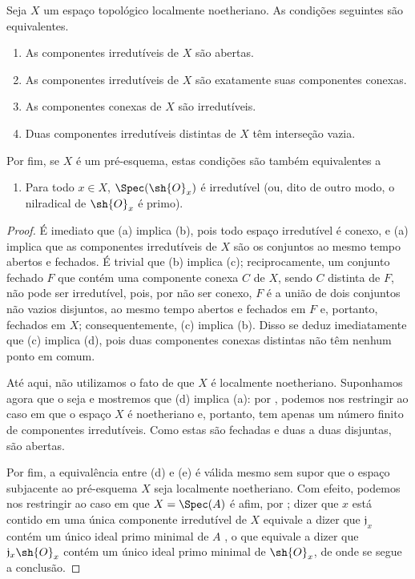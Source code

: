 \documentclass[oneside]{amsart}
\newcommand{\oldpage}[2][]{{\marginnote{\normalfont\textbf{#1}~|~#2}}\ignorespaces}
\let\EGAOriginalLabel\label
\renewcommand{\label}[1]{\phantomsection\EGAOriginalLabel{#1}}
\begin{document}
\begin{proposition}[6.1.10]
\label{I.6.1.10}
Seja $X$ um espaço topológico localmente noetheriano.
As condições seguintes são equivalentes.
\begin{enumerate}
  \item[{\rm(a)}] As componentes irredutíveis de $X$ são abertas.
  \item[{\rm(b)}] As componentes irredutíveis de $X$ são exatamente suas
    componentes conexas.
  \item[{\rm(c)}] As componentes conexas de $X$ são irredutíveis.
  \item[{\rm(d)}] Duas componentes irredutíveis distintas de $X$ têm
    interseção vazia.
\end{enumerate}
Por fim, se $X$ é um pré-esquema, estas condições são também equivalentes a
\begin{enumerate}
  \item[{\rm(e)}] Para todo $x\in X$, $\Spec(\sh{O}_x)$ é irredutível (ou,
    dito de outro modo, o nilradical de $\sh{O}_x$ é primo).
\end{enumerate}
\end{proposition}

\begin{proof}
É imediato que (a) implica (b), pois todo espaço irredutível é conexo, e (a)
implica que as componentes irredutíveis de $X$ são os conjuntos ao mesmo tempo
abertos e fechados. É trivial que (b) implica (c); reciprocamente, um conjunto
fechado $F$ que contém
\oldpage[I]{143}
uma componente conexa $C$ de $X$, sendo $C$ distinta de $F$, não pode ser
irredutível, pois, por não ser conexo, $F$ é a união de dois conjuntos não
vazios disjuntos, ao mesmo tempo abertos e fechados em $F$ e, portanto,
fechados em $X$; consequentemente, (c) implica (b). Disso se deduz
imediatamente que (c) implica (d), pois duas componentes conexas distintas não
têm nenhum ponto em comum.

Até aqui, não utilizamos o fato de que $X$ é localmente noetheriano. Suponhamos
agora que o seja e mostremos que (d) implica (a): por ,
podemos nos restringir ao caso em que o espaço $X$ é noetheriano e, portanto,
tem apenas um número finito de componentes irredutíveis. Como estas são
fechadas e duas a duas disjuntas, são abertas.

Por fim, a equivalência entre (d) e (e) é válida mesmo sem supor que o espaço
subjacente ao pré-esquema $X$ seja localmente noetheriano. Com efeito, podemos
nos restringir ao caso em que $X=\Spec(A)$ é afim, por ;
dizer que $x$ está contido em uma única componente irredutível de $X$ equivale
a dizer que $\mathfrak{j}_x$ contém um único ideal primo minimal de $A$
, o que equivale a dizer que
$\mathfrak{j}_x\sh{O}_x$ contém um único ideal primo minimal de $\sh{O}_x$,
de onde se segue a conclusão.
\end{proof}
\end{document}
